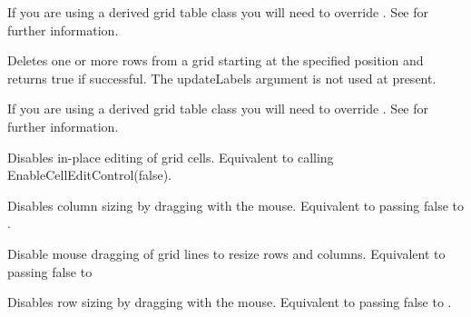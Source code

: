 If you are using a derived grid table class you will need to override 
. See 
 for further information.

\label{wxgriddeleterows}


Deletes one or more rows from a grid starting at the specified position and returns
true if successful. The updateLabels argument is not used at present.

If you are using a derived grid table class you will need to override 
. See 
 for further information.

\label{wxgriddisablecelleditcontrol}


Disables in-place editing of grid cells. 
Equivalent to calling EnableCellEditControl(false).

\label{wxgriddisabledragcolsize}


Disables column sizing by dragging with the mouse. Equivalent to passing false to 
. 

\label{wxgriddisabledraggridsize}


Disable mouse dragging of grid lines to resize rows and columns. Equivalent to passing
false to 

\label{wxgriddisabledragrowsize}


Disables row sizing by dragging with the mouse. Equivalent to passing false to 
. 

\label{wxgridenablecelleditcontrol}


